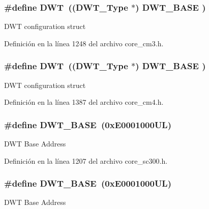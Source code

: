 \subsubsection[{\texorpdfstring{D\+WT}{DWT}}]{\setlength{\rightskip}{0pt plus 5cm}\#define D\+WT~(({\bf D\+W\+T\+\_\+\+Type}       $\ast$)     {\bf D\+W\+T\+\_\+\+B\+A\+SE}      )}\hypertarget{group___c_m_s_i_s__core__base_gabbe5a060185e1d5afa3f85b14e10a6ce}{}\label{group___c_m_s_i_s__core__base_gabbe5a060185e1d5afa3f85b14e10a6ce}
D\+WT configuration struct 

Definición en la línea 1248 del archivo core\+\_\+cm3.\+h.

\subsubsection[{\texorpdfstring{D\+WT}{DWT}}]{\setlength{\rightskip}{0pt plus 5cm}\#define D\+WT~(({\bf D\+W\+T\+\_\+\+Type}       $\ast$)     {\bf D\+W\+T\+\_\+\+B\+A\+SE}      )}\hypertarget{group___c_m_s_i_s__core__base_gabbe5a060185e1d5afa3f85b14e10a6ce}{}\label{group___c_m_s_i_s__core__base_gabbe5a060185e1d5afa3f85b14e10a6ce}
D\+WT configuration struct 

Definición en la línea 1387 del archivo core\+\_\+cm4.\+h.

\subsubsection[{\texorpdfstring{D\+W\+T\+\_\+\+B\+A\+SE}{DWT_BASE}}]{\setlength{\rightskip}{0pt plus 5cm}\#define D\+W\+T\+\_\+\+B\+A\+SE~(0x\+E0001000\+U\+L)}\hypertarget{group___c_m_s_i_s__core__base_gafdab534f961bf8935eb456cb7700dcd2}{}\label{group___c_m_s_i_s__core__base_gafdab534f961bf8935eb456cb7700dcd2}
D\+WT Base Address 

Definición en la línea 1207 del archivo core\+\_\+sc300.\+h.

\subsubsection[{\texorpdfstring{D\+W\+T\+\_\+\+B\+A\+SE}{DWT_BASE}}]{\setlength{\rightskip}{0pt plus 5cm}\#define D\+W\+T\+\_\+\+B\+A\+SE~(0x\+E0001000\+U\+L)}\hypertarget{group___c_m_s_i_s__core__base_gafdab534f961bf8935eb456cb7700dcd2}{}\label{group___c_m_s_i_s__core__base_gafdab534f961bf8935eb456cb7700dcd2}
D\+WT Base Address 

